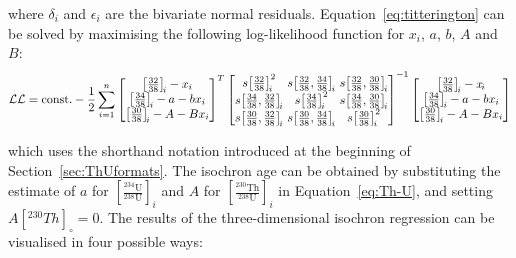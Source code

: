 \begin{refsection}
\noindent where $\delta_i$ and $\epsilon_i$ are the bivariate normal
residuals. Equation~\ref{eq:titterington} can be solved by maximising
the following log-likelihood function for $x_i$, $a$, $b$, $A$ and
$B$:
\begin{equation}
  \mathcal{LL} = \mbox{const.} - 
  \frac{1}{2} \sum\limits_{i=1}^{n}
  \left[
    \begin{array}{@{}c@{}}
      \left[\frac{32}{38}\right]_{\!i} - x_{i} \\
      \left[\frac{34}{38}\right]_{\!i} - a - b x_{i} \\
      \left[\frac{30}{38}\right]_{\!i} - A - B x_{i}
    \end{array}
    \right]^T
  \left[
    \begin{array}{@{}c@{~}c@{~}c@{}}
      s\!\left[\frac{32}{38}\right]_{\!i}^2 &
      s\!\left[\frac{32}{38},\frac{34}{38}\right]_{\!i} &
      s\!\left[\frac{32}{38},\frac{30}{38}\right]_{\!i} \\
      s\!\left[\frac{34}{38},\frac{32}{38}\right]_{\!i} &
      s\!\left[\frac{34}{38}\right]_{\!i}^2 &
      s\!\left[\frac{34}{38},\frac{30}{38}\right]_{\!i} \\
      s\!\left[\frac{30}{38},\frac{32}{38}\right]_{\!i} &
      s\!\left[\frac{30}{38},\frac{34}{38}\right]_{\!i} &
      s\!\left[\frac{30}{38}\right]_{\!i}^2
    \end{array}
    \right]^{-1}
  \left[
    \begin{array}{@{}c@{}}
      \left[\frac{32}{38}\right]_{\!i} - x_{\!i} \\
      \left[\frac{34}{38}\right]_{\!i} - a - b x_{i} \\
      \left[\frac{30}{38}\right]_{\!i} - A - B x_{i}
    \end{array}
    \right]
\end{equation}

\noindent which uses the shorthand notation introduced at the
beginning of Section~\ref{sec:ThUformats}. The isochron age can be
obtained by substituting the estimate of $a$ for
$\left[\frac{{}^{234}\mbox{U}}{{}^{238}\mbox{U}}\right]_i$ and $A$ for
$\left[\frac{{}^{230}\mbox{Th}}{{}^{238}\mbox{U}}\right]_i$ in
Equation~\ref{eq:Th-U}, and setting $A[{}^{230}Th]_{\circ}=0$.  The
results of the three-dimensional isochron regression can be visualised
in four possible ways:


\end{refsection}
